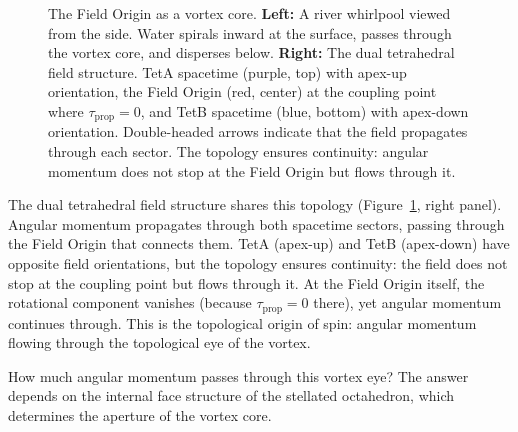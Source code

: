 \documentclass[aps,prd,preprint,superscriptaddress,showpacs,preprintnumbers,amsmath,amssymb,nofootinbib]{revtex4-2}
\begin{document}
\begin{figure}[H]
\caption{The Field Origin as a vortex core.
\textbf{Left:} A river whirlpool viewed from the side. Water spirals inward at the surface, passes through the vortex core, and disperses below.
\textbf{Right:} The dual tetrahedral field structure. TetA spacetime (purple, top) with apex-up orientation, the Field Origin (red, center) at the coupling point where $\tau_{\text{prop}} = 0$, and TetB spacetime (blue, bottom) with apex-down orientation. Double-headed arrows indicate that the field propagates through each sector. The topology ensures continuity: angular momentum does not stop at the Field Origin but flows through it.}
\label{fig:vortex}
\end{figure}

The dual tetrahedral field structure shares this topology (Figure~\ref{fig:vortex}, right panel). Angular momentum propagates through both spacetime sectors, passing through the Field Origin that connects them. TetA (apex-up) and TetB (apex-down) have opposite field orientations, but the topology ensures continuity: the field does not stop at the coupling point but flows through it. At the Field Origin itself, the rotational component vanishes (because $\tau_{\text{prop}} = 0$ there), yet angular momentum continues through. This is the topological origin of spin: angular momentum flowing through the topological eye of the vortex.

How much angular momentum passes through this vortex eye? The answer depends on the internal face structure of the stellated octahedron, which determines the aperture of the vortex core.
\end{document}
